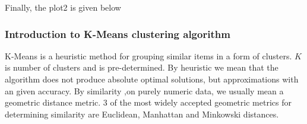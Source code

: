 \documentclass[11pt]{article}
\begin{document}
			\fi
			Finally, the plot2 is given below

			\subsubsection*{Introduction to K-Means clustering algorithm}
				K-Means is a heuristic method for grouping {similar} items in a form of clusters. $K$ is number of clusters and is pre-determined. By heuristic we mean that the algorithm does not produce absolute optimal solutions, but approximations with an given accuracy. By similarity ,on purely numeric data, we usually mean a geometric distance metric. 3 of the most widely accepted geometric metrics for determining similarity are Euclidean, Manhattan and Minkowski distances.
\end{document}
